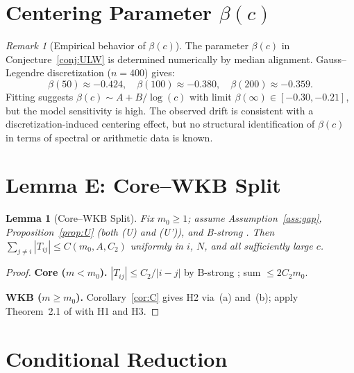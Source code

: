 \documentclass[12pt]{amsart}
\newtheorem{lemma}[theorem]{Lemma}
\theoremstyle{definition}
\theoremstyle{remark}
\newtheorem{remark}[theorem]{Remark}
\begin{document}
\section{Centering Parameter $\beta(c)$}
\label{sec:beta}

\begin{remark}[Empirical behavior of $\beta(c)$]
\label{rem:beta}
The parameter $\beta(c)$ in Conjecture~\ref{conj:ULW}
is determined numerically by median alignment.
Gauss--Legendre discretization ($n=400$) gives:
\[
  \beta(50)\approx -0.424,\quad
  \beta(100)\approx -0.380,\quad
  \beta(200)\approx -0.359.
\]
Fitting suggests $\beta(c)\sim A+B/\log(c)$ with
limit $\beta(\infty)\in[-0.30,-0.21]$,
but the model sensitivity is high.
The observed drift is consistent with a
discretization-induced centering effect,
but no structural identification of $\beta(c)$
in terms of spectral or arithmetic data is known.
\end{remark}

\section{Lemma E: Core--WKB Split}
\label{sec:split}

\begin{lemma}[Core--WKB Split]
\label{lem:E}
Fix $m_0 \ge 1$; assume Assumption~\ref{ass:gap},
Proposition~\ref{prop:U} (both \textup{(U)} and
\textup{(U')}), and B-strong \cite{paperVI}.
Then $\sum_{j\ne i}|T_{ij}| \le C(m_0,A,C_2)$
uniformly in $i$, $N$, and all sufficiently large $c$.
\end{lemma}

\begin{proof}
\textbf{Core ($m<m_0$).}
$|T_{ij}| \le C_2/|i-j|$ by B-strong
\cite[Lemma~5.2]{paperVII};
sum $\le 2C_2 m_0$.

\textbf{WKB ($m\ge m_0$).}
Corollary~\ref{cor:C} gives H2 via~(a) and~(b);
apply Theorem~2.1 of \cite{paperVII} with H1 and H3.
\end{proof}

\section{Conditional Reduction}
\label{sec:closure}
\end{document}
